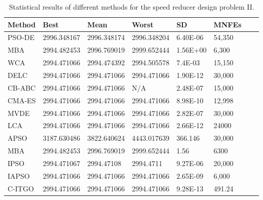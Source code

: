 
\begin{table*}[tp]
    \tiny
    \begin{center}
    
    \begin{tabular}{ P{2.0cm} P{2.0cm} P{2.0cm} P{2.0cm} P{2.0cm} P{2.0cm} P{2.0cm} P{2.0cm}  }
    \hline
    \textbf{Method} & \textbf{Best} & \textbf{Mean} & \textbf{Worst} & \textbf{SD} & \textbf{MNFEs} \\
    \hline
    
    PSO-DE & 2996.348167 & 2996.348174 & 2996.348204 & 6.40E-06 & 54,350 \\
    MBA & 2994.482453 & 2996.769019 & 2999.652444 & 1.56E+00 & 6,300 \\
    WCA & 2994.471066 & 2994.474392 & 2994.505578 & 7.4E-03 & 15,150 \\    
    DELC & 2994.471066 & 2994.471066 & 2994.471066 & 1.90E-12 & 30,000 \\
    CB-ABC & 2994.471066 & 2994.471066 & N/A & 2.48E-07 & 15,000 \\
    CMA-ES & 2994.471066 & 2994.471066 & 2994.471066 & 8.98E-10 & 12,998 \\
    MVDE & 2994.471066 & 2994.471066 & 2994.471066 & 2.82E-07 & 30,000 \\    
    LCA & 2994.471066 & 2994.471066 & 2994.471066 & 2.66E-12 & 24000 \\
    APSO & 3187.630486 & 3822.640624 & 4443.017639 & 366.146 & 30,000 \\
    MBA & 2994.482453 & 2996.769019 & 2999.652444 & 1.56 & 6300 \\
    IPSO & 2994.471067 & 2994.47108 & 2994.4711 & 9.27E-06 & 20,000 \\
    IAPSO & 2994.471066 & 2994.471066 & 2994.471066 & 2.65E-09 & 6,000 \\
    C-ITGO & 2994.471066 & 2994.471066 & 2994.471066 & 9.28E-13 & 491.24 \\ 
    
  

    \hline
    \end{tabular}
    \end{center}
    \vspace*{-6mm}
    \caption{Statistical results of different methods for the speed reducer design problem II. \\[1em]}
    \label{tab:SP2}
    \end{table*}
    
    